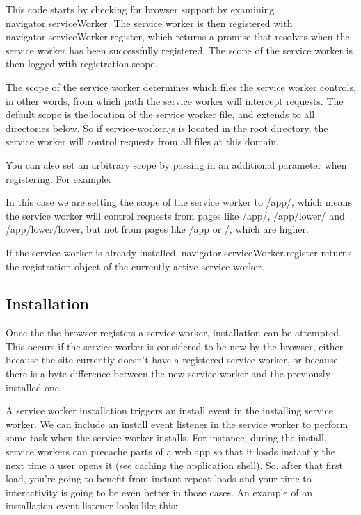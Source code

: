 This code starts by checking for browser support by examining navigator.serviceWorker. The service worker is then registered with navigator.serviceWorker.register, which returns a promise that resolves when the service worker has been successfully registered. The scope of the service worker is then logged with registration.scope.

The scope of the service worker determines which files the service worker controls, in other words, from which path the service worker will intercept requests. The default scope is the location of the service worker file, and extends to all directories below. So if service-worker.js is located in the root directory, the service worker will control requests from all files at this domain.

You can also set an arbitrary scope by passing in an additional parameter when registering. For example:

In this case we are setting the scope of the service worker to /app/, which means the service worker will control requests from pages like /app/, /app/lower/ and /app/lower/lower, but not from pages like /app or /, which are higher.

If the service worker is already installed, navigator.serviceWorker.register returns the registration object of the currently active service worker.



\subsection*{Installation}

Once the the browser registers a service worker, installation can be attempted. This occurs if the service worker is considered to be new by the browser, either because the site currently doesn't have a registered service worker, or because there is a byte difference between the new service worker and the previously installed one.

A service worker installation triggers an install event in the installing service worker. We can include an install event listener in the service worker to perform some task when the service worker installs. For instance, during the install, service workers can precache parts of a web app so that it loads instantly the next time a user opens it (see caching the application shell). So, after that first load, you're going to benefit from instant repeat loads and your time to interactivity is going to be even better in those cases. An example of an installation event listener looks like this:

